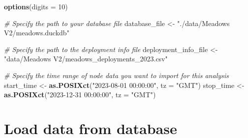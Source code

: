 \documentclass[
]{book}
\newenvironment{Shaded}{\begin{snugshade}}{\end{snugshade}}
\newcommand{\AttributeTok}[1]{\textcolor[rgb]{0.13,0.29,0.53}{#1}}
\newcommand{\CommentTok}[1]{\textcolor[rgb]{0.56,0.35,0.01}{\textit{#1}}}
\newcommand{\DecValTok}[1]{\textcolor[rgb]{0.00,0.00,0.81}{#1}}
\newcommand{\FunctionTok}[1]{\textcolor[rgb]{0.13,0.29,0.53}{\textbf{#1}}}
\newcommand{\NormalTok}[1]{#1}
\newcommand{\OtherTok}[1]{\textcolor[rgb]{0.56,0.35,0.01}{#1}}
\newcommand{\StringTok}[1]{\textcolor[rgb]{0.31,0.60,0.02}{#1}}
\begin{document}
\begin{Shaded}
\begin{Highlighting}[]
\FunctionTok{options}\NormalTok{(}\AttributeTok{digits =} \DecValTok{10}\NormalTok{)}

\CommentTok{\# Specify the path to your database file}
\NormalTok{database\_file }\OtherTok{\textless{}{-}} \StringTok{"./data/Meadows V2/meadows.duckdb"}

\CommentTok{\# Specify the path to the deployment info file}
\NormalTok{deployment\_info\_file }\OtherTok{\textless{}{-}} \StringTok{"data/Meadows V2/meadows\_deployments\_2023.csv"}

\CommentTok{\# Specify the time range of node data you want to import for this analysis}
\NormalTok{start\_time }\OtherTok{\textless{}{-}} \FunctionTok{as.POSIXct}\NormalTok{(}\StringTok{"2023{-}08{-}01 00:00:00"}\NormalTok{, }\AttributeTok{tz =} \StringTok{"GMT"}\NormalTok{)}
\NormalTok{stop\_time }\OtherTok{\textless{}{-}} \FunctionTok{as.POSIXct}\NormalTok{(}\StringTok{"2023{-}12{-}31 00:00:00"}\NormalTok{, }\AttributeTok{tz =} \StringTok{"GMT"}\NormalTok{)}
\end{Highlighting}
\end{Shaded}

\section{Load data from database}\label{load-data-from-database-1}
\end{document}
